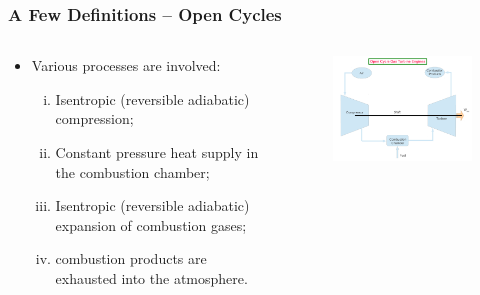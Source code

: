 \documentclass[10pt,compress]{beamer}
\begin{document}
\begin{frame}
 \frametitle{A Few Definitions -- Open Cycles}
 \begin{columns}
  \begin{column}[c]{0.4\linewidth}
   \begin{itemize}
    \item Various processes are involved:
     \begin{enumerate}[(i)]
      \item <2-> Isentropic (reversible adiabatic) compression;
      \item <3-> Constant pressure heat supply in the combustion chamber;
      \item <4-> Isentropic (reversible adiabatic) expansion of combustion gases;
      \item <5-> combustion products are exhausted into the atmosphere.
     \end{enumerate}
   \end{itemize}
  \end{column}
  \begin{column}[c]{0.6\linewidth}
   \begin{figure}%
    \begin{center}
     \includegraphics[width=7.5cm,clip]{./Pics/Open_Gas_Turbine_Engines}
    \end{center}
   \end{figure}  
  \end{column}  
 \end{columns}
 \normalsize

\end{frame}
\end{document}
